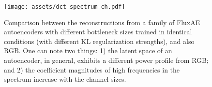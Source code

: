 \begin{figure}[t]
\centering
\texttt{[image: assets/dct-spectrum-ch.pdf]}
\caption{Comparison between the reconstructions from a family of FluxAE autoencoders with different bottleneck sizes trained in identical conditions (with different KL regularization strengths), and also RGB. One can note two things: 1) the latent space of an autoencoder, in general, exhibits a different power profile from RGB; and 2) the coefficient magnitudes of high frequencies in the spectrum increase with the channel sizes.} 
\label{fig:spectrums-comparison-flux}
\end{figure}
